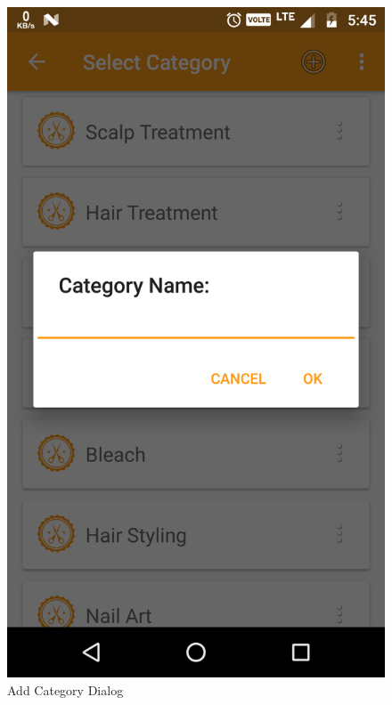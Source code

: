 \\
\begin{figure}[h]
	\centering
	\includegraphics[width=0.7\linewidth]{AddCategory}
	\caption{Add Category Dialog}
\end{figure}
\pagebreak


